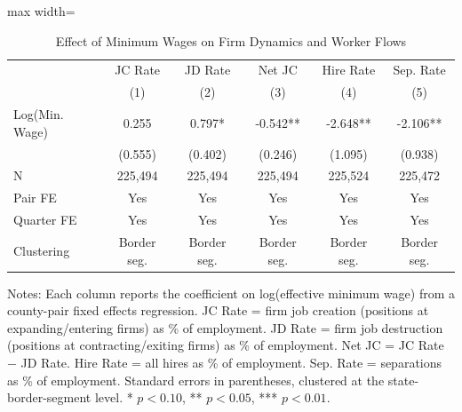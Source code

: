 \begin{table}[H]
\centering
\caption{Effect of Minimum Wages on Firm Dynamics and Worker Flows}
\label{tab:firm_dynamics}
\begin{threeparttable}
\begin{adjustbox}{max width=\textwidth}
\begin{tabular}{lccccc}
\toprule
 & JC Rate & JD Rate & Net JC & Hire Rate & Sep. Rate \\
 & (1) & (2) & (3) & (4) & (5) \\
\midrule
Log(Min. Wage) & 0.255 & 0.797* & -0.542** & -2.648** & -2.106** \\
 & (0.555) & (0.402) & (0.246) & (1.095) & (0.938) \\
\midrule
N & 225,494 & 225,494 & 225,494 & 225,524 & 225,472 \\
Pair FE & Yes & Yes & Yes & Yes & Yes \\
Quarter FE & Yes & Yes & Yes & Yes & Yes \\
Clustering & Border seg. & Border seg. & Border seg. & Border seg. & Border seg. \\
\bottomrule
\end{tabular}
\end{adjustbox}
\begin{tablenotes}[flushleft]
\small
\item Notes: Each column reports the coefficient on log(effective minimum wage) from a county-pair fixed effects regression. JC Rate = firm job creation (positions at expanding/entering firms) as \% of employment. JD Rate = firm job destruction (positions at contracting/exiting firms) as \% of employment. Net JC = JC Rate $-$ JD Rate. Hire Rate = all hires as \% of employment. Sep. Rate = separations as \% of employment. Standard errors in parentheses, clustered at the state-border-segment level. * $p<0.10$, ** $p<0.05$, *** $p<0.01$.
\end{tablenotes}
\end{threeparttable}
\end{table}
